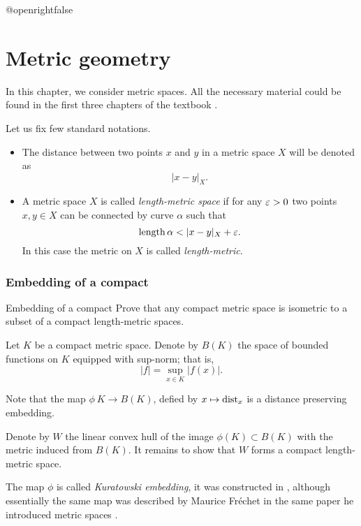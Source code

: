 \csname @openrightfalse\endcsname
\chapter{Metric geometry}

In this chapter, we consider metric spaces.
All the necessary material could be found in the first three chapters of the textbook \cite{bbi}. 

Let us fix few standard notations.
\begin{itemize}
\item The distance between two points $x$ and $y$ in a metric space $X$
will be denoted as 
\[|x-y|_X.\]
\item A metric space $X$ is called {}\emph{length-metric space} if for any $\varepsilon>0$ two points $x,y\in X$ can be connected by curve $\alpha$
such that
\[\length\alpha<|x-y|_X+\eps.\]
In this case the metric on $X$ is called \emph{length-metric}.
\end{itemize}

\subsection*{Embedding of a compact}

\begin{pr}{}{Embedding of a compact}\label{compact} 
Prove that any compact metric space 
is isometric to 
a subset of a compact length-metric spaces.
\end{pr}

Let $K$ be a compact metric space.
Denote by $B(K)$ the space of bounded functions on $K$
equipped with sup-norm; 
that is, 
\[|f|=\sup_{x\in K}|f(x)|.\]

Note that the map $\phi\:K\to B(K)$, defied by $x\mapsto \operatorname{\rm dist}_x$
is a distance preserving embedding.

Denote by $W$ the linear convex hull of the image $\phi(K)\subset B(K)$ 
with the metric induced from $B(K)$.
It remains to show that $W$ forms a compact length-metric space.
\qeds

The map $\phi$ is called \emph{Kuratowski embedding},
it was constructed in \cite{kuratowski},
although essentially the same map 
was described by Maurice Fr\'echet 
in the same paper he introduced metric spaces \cite[see][]{frechet}.


